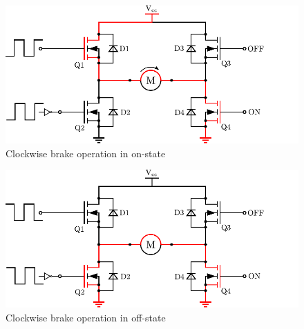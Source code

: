   \begin{minipage}{\linewidth}
  	\centering
  	\begin{minipage}{0.45\linewidth}
  		\begin{figure}[H]
  			\centering
  			\includegraphics[scale=.6]{figures/HbridgeClockwiseBrakeON.pdf}
  			\caption{Clockwise brake operation in on-state}
  			\label{HbridgeClockwiseBrakeON}
  		\end{figure}
  	\end{minipage}
  	\hspace{0.03\linewidth}
  	\begin{minipage}{0.45\linewidth}
  		\begin{figure}[H]
  			\centering
  			\includegraphics[scale=.6]{figures/HbridgeClockwiseBrakeOFF.pdf}
  			\caption{Clockwise brake operation in off-state}
  			\label{HbridgeClockwiseBrakeOFF}
  		\end{figure}
  	\end{minipage}
  \end{minipage}

